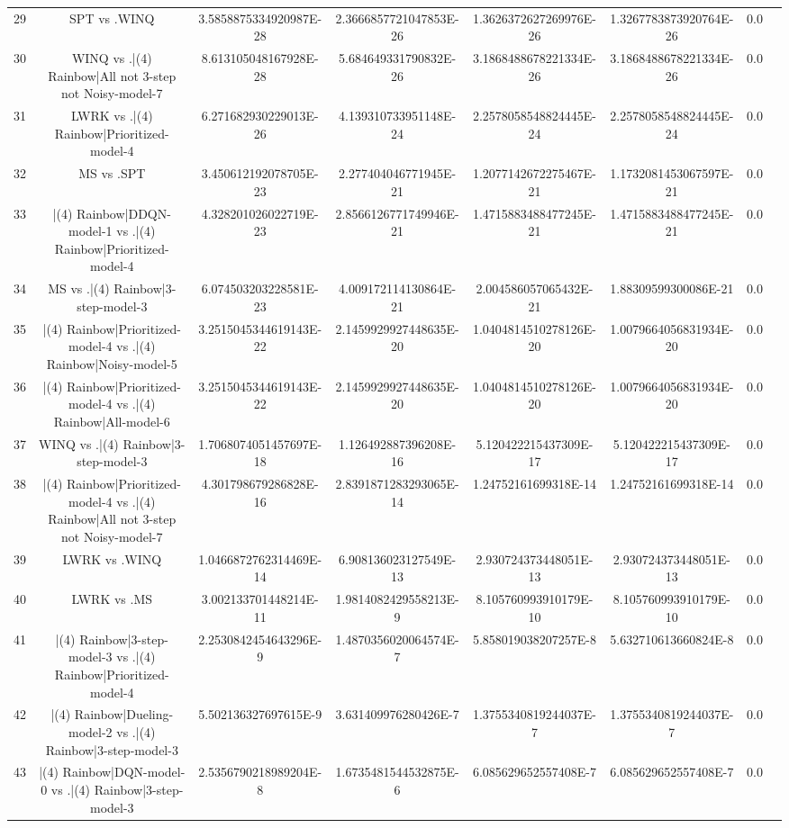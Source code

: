 \documentclass[a3paper,10pt]{article}
\begin{document}
\begin{table}[!htp]
\begin{tabular}{cccccccc}
29&SPT vs .WINQ&3.5858875334920987E-28&2.3666857721047853E-26&1.3626372627269976E-26&1.3267783873920764E-26&0.0\\
30&WINQ vs .|(4) Rainbow|All not 3-step not Noisy-model-7&8.613105048167928E-28&5.684649331790832E-26&3.1868488678221334E-26&3.1868488678221334E-26&0.0\\
31&LWRK vs .|(4) Rainbow|Prioritized-model-4&6.271682930229013E-26&4.139310733951148E-24&2.2578058548824445E-24&2.2578058548824445E-24&0.0\\
32&MS vs .SPT&3.450612192078705E-23&2.277404046771945E-21&1.2077142672275467E-21&1.1732081453067597E-21&0.0\\
33&|(4) Rainbow|DDQN-model-1 vs .|(4) Rainbow|Prioritized-model-4&4.328201026022719E-23&2.8566126771749946E-21&1.4715883488477245E-21&1.4715883488477245E-21&0.0\\
34&MS vs .|(4) Rainbow|3-step-model-3&6.074503203228581E-23&4.009172114130864E-21&2.004586057065432E-21&1.88309599300086E-21&0.0\\
35&|(4) Rainbow|Prioritized-model-4 vs .|(4) Rainbow|Noisy-model-5&3.2515045344619143E-22&2.1459929927448635E-20&1.0404814510278126E-20&1.0079664056831934E-20&0.0\\
36&|(4) Rainbow|Prioritized-model-4 vs .|(4) Rainbow|All-model-6&3.2515045344619143E-22&2.1459929927448635E-20&1.0404814510278126E-20&1.0079664056831934E-20&0.0\\
37&WINQ vs .|(4) Rainbow|3-step-model-3&1.7068074051457697E-18&1.126492887396208E-16&5.120422215437309E-17&5.120422215437309E-17&0.0\\
38&|(4) Rainbow|Prioritized-model-4 vs .|(4) Rainbow|All not 3-step not Noisy-model-7&4.301798679286828E-16&2.8391871283293065E-14&1.24752161699318E-14&1.24752161699318E-14&0.0\\
39&LWRK vs .WINQ&1.0466872762314469E-14&6.908136023127549E-13&2.930724373448051E-13&2.930724373448051E-13&0.0\\
40&LWRK vs .MS&3.002133701448214E-11&1.9814082429558213E-9&8.105760993910179E-10&8.105760993910179E-10&0.0\\
41&|(4) Rainbow|3-step-model-3 vs .|(4) Rainbow|Prioritized-model-4&2.2530842454643296E-9&1.4870356020064574E-7&5.858019038207257E-8&5.632710613660824E-8&0.0\\
42&|(4) Rainbow|Dueling-model-2 vs .|(4) Rainbow|3-step-model-3&5.502136327697615E-9&3.631409976280426E-7&1.3755340819244037E-7&1.3755340819244037E-7&0.0\\
43&|(4) Rainbow|DQN-model-0 vs .|(4) Rainbow|3-step-model-3&2.5356790218989204E-8&1.6735481544532875E-6&6.085629652557408E-7&6.085629652557408E-7&0.0\\

\end{tabular}
\end{table}
\end{document}
